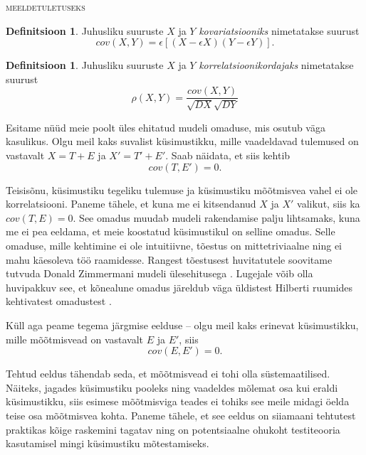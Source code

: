 \documentclass[a4paper,12pt,oneside]{article}
\newenvironment{meeldetuletus}{
	\begin{lrbox}{\thisOne}
		\begin{minipage}{0.95\textwidth} \vspace{0.25em} {\scriptsize \textsc{meeldetuletuseks}} \linebreak \vspace{-0.5em}
} 
{  
 \end{minipage}\end{lrbox}{
 		
 			\begin{mdframed}[tikzsetting={draw=black,dashed,line width=0.5pt, dash pattern = on 10pt off 3pt},%
 			linecolor=background_example,backgroundcolor=background_example,outerlinewidth=1pt]
			
 			\usebox{\thisOne}
 			\end{mdframed}
 		
 		
 	}
}
\numberwithin{equation}{section}
\theoremstyle{definition}
\newtheorem*{kovariatsioon}{Definitsioon}
\newtheorem*{korrelatsioon}{Definitsioon}
\begin{document}
\begin{meeldetuletus}
\begin{kovariatsioon}
Juhusliku suuruste $X$ ja $Y$ \textit{kovariatsiooniks} nimetatakse suurust
\begin{equation*}
cov(X,Y) = \epsilon \left[  \left( X - \epsilon X \right)\left(Y - \epsilon Y \right) \right]  \text{.}
\end{equation*}
\end{kovariatsioon}
\begin{korrelatsioon}
Juhusliku suuruste $X$ ja $Y$ \textit{korrelatsioonikordajaks} nimetatakse suurust 
\begin{equation*}
\rho (X,Y) = \frac{cov(X,Y)}{\sqrt{DX}\sqrt{DY}} 
\end{equation*}
\end{korrelatsioon}
\end{meeldetuletus}

Esitame nüüd meie poolt üles ehitatud mudeli omaduse, mis osutub väga kasulikus. Olgu meil kaks suvalist küsimustikku, mille vaadeldavad tulemused on vastavalt $X = T + E$ ja $X' = T' + E'$. Saab näidata, et  siis kehtib 
\begin{equation}
\label{eq:cov_zero}
cov(T,E') = 0 \text{.}
\end{equation} 

Teisisõnu, küsimustiku tegeliku tulemuse ja küsimustiku mõõtmisvea vahel ei ole korrelatsiooni. Paneme tähele, et kuna me ei kitsendanud $X$ ja $X'$ valikut, siis ka $cov(T,E) = 0$. See omadus muudab mudeli rakendamise palju lihtsamaks, kuna me ei pea eeldama, et meie koostatud küsimustikul on selline omadus. Selle omaduse, mille kehtimine ei ole intuitiivne, tõestus on mittetriviaalne ning ei mahu käesoleva töö raamidesse. Rangest tõestusest huvitatutele soovitame tutvuda Donald Zimmermani mudeli ülesehitusega \cite{Zimmerman1976}. Lugejale võib olla huvipakkuv see, et kõnealune omadus järeldub väga üldistest Hilberti ruumides kehtivatest omadustest \cite{Zimmerman1975}.


Küll aga peame tegema järgmise eelduse -- olgu meil kaks erinevat küsimustikku, mille mõõtmisvead on vastavalt $E$ ja $E'$, siis 
\begin{equation}
\label{eq:error_cov_0}
cov(E,E') = 0 \text{.}
\end{equation}

Tehtud eeldus tähendab seda, et mõõtmisvead ei tohi olla süstemaatilised. Näiteks, jagades küsimustiku pooleks ning vaadeldes mõlemat osa kui eraldi küsimustikku, siis  esimese mõõtmisviga teades ei tohiks see meile midagi öelda teise osa mõõtmis\-vea kohta. Paneme tähele, et see eeldus on siiamaani tehtutest praktikas kõige raskemini tagatav ning on potentsiaalne ohukoht testiteooria kasutamisel mingi küsimus\-tiku mõtestamiseks.
\end{document}
